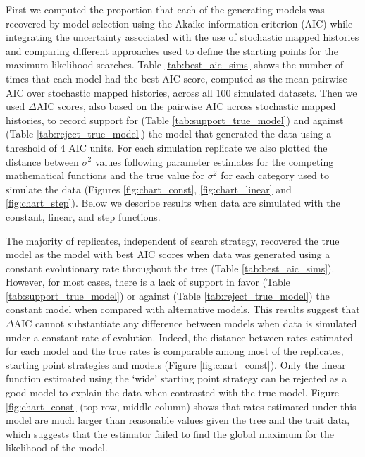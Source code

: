 First we computed the proportion that each of the generating models was recovered by model selection using the Akaike information criterion (AIC) while integrating the uncertainty associated with the use of stochastic mapped histories and comparing different approaches used to define the starting points for the maximum likelihood searches. Table \ref{tab:best_aic_sims} shows the number of times that each model had the best AIC score, computed as the mean pairwise AIC over stochastic mapped histories, across all 100 simulated datasets. Then we used $\Delta$AIC scores, also based on the pairwise AIC across stochastic mapped histories, to record support for (Table \ref{tab:support_true_model}) and against (Table \ref{tab:reject_true_model}) the model that generated the data using a threshold of 4 AIC units. For each simulation replicate we also plotted the distance between $\sigma^{2}$ values following parameter estimates for the competing mathematical functions and the true value for $\sigma^{2}$ for each category used to simulate the data (Figures \ref{fig:chart_const}, \ref{fig:chart_linear} and \ref{fig:chart_step}). Below we describe results when data are simulated with the constant, linear, and step functions.

The majority of replicates, independent of search strategy, recovered the true model as the model with best AIC scores when data was generated using a constant evolutionary rate throughout the tree (Table \ref{tab:best_aic_sims}). However, for most cases, there is a lack of support in favor (Table \ref{tab:support_true_model}) or against (Table \ref{tab:reject_true_model}) the constant model when compared with alternative models. This results suggest that $\Delta$AIC cannot substantiate any difference between models when data is simulated under a constant rate of evolution. Indeed, the distance between rates estimated for each model and the true rates is comparable among most of the replicates, starting point strategies and models (Figure \ref{fig:chart_const}). Only the linear function estimated using the `wide' starting point strategy can be rejected as a good model to explain the data when contrasted with the true model. Figure \ref{fig:chart_const} (top row, middle column) shows that rates estimated under this model are much larger than reasonable values given the tree and the trait data, which suggests that the estimator failed to find the global maximum for the likelihood of the model.

